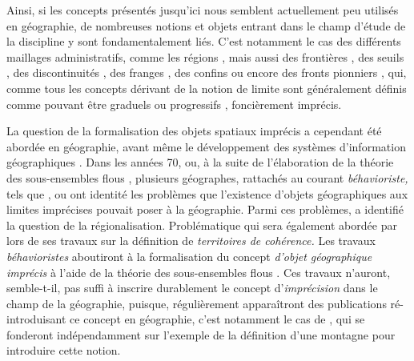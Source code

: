 Ainsi, si les concepts présentés jusqu’ici nous semblent actuellement
peu utilisés en géographie, de nombreuses notions et objets entrant
dans le champ d’étude de la discipline y sont fondamentalement
liés. C’est notamment le cas des différents maillages administratifs,
comme les régions \autocite{Brennetot2014}, mais aussi des frontières
\autocite{Brunet1992}, des seuils \autocite{Brunet1992, Levy2013}, des
discontinuités \autocite{Brunet1992, Brunet1997}, des franges
\autocite{Brunet1992}, des confins \autocite{Brunet1997} ou encore des
fronts pionniers \autocite{Brunet1992}, qui, comme tous les concepts
dérivant de la notion de limite sont généralement définis comme
pouvant être graduels ou progressifs \autocite{Brunet1992, Levy2013},
\ie foncièrement imprécis.

La question de la formalisation des objets spatiaux imprécis a
cependant été abordée en géographie, avant même le développement des
systèmes d’information géographiques \autocite{Robinson2003}. Dans les
années 70, ou, à la suite de l’élaboration de la théorie des
sous-ensembles flous \autocite{Zadeh1965}, plusieurs géographes,
rattachés au courant \emph{béhavioriste,} tels que
\textcite{Gale1972,Gale1976}, \textcite{Pipkin1978} ou
\textcite{Leung1979,Leung1987} ont identité les problèmes que
l’existence d’objets géographiques aux limites imprécises pouvait
poser à la géographie. Parmi ces problèmes, \textcite{Gale1976} a
identifié la question de la régionalisation. Problématique qui sera
également abordée par \textcite{Rolland-May1996,Rolland-May1999} lors
de ses travaux sur la définition de \emph{territoires de cohérence.}
Les travaux \emph{béhavioristes} aboutiront à la formalisation du
concept \emph{d’objet géographique imprécis} à l’aide de la théorie
des sous-ensembles flous \autocite{Leung1987}. Ces travaux n’auront,
semble-t-il, pas suffi à inscrire durablement le concept
d’\emph{imprécision} dans le champ de la géographie, puisque,
régulièrement apparaîtront des publications ré-introduisant ce concept
en géographie, c’est notamment le cas de \textcite{Fisher1998},
\textcite{Collins2000, Varzi2001} qui se fonderont indépendamment sur
l’exemple de la définition d’une montagne pour introduire cette
notion.

